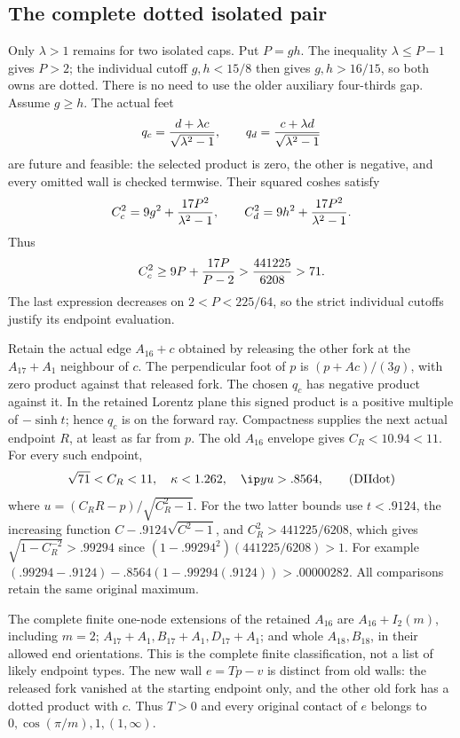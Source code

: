\subsection{The complete dotted isolated pair}
\label{app:D18isolateddotted}

Only \(\lambda>1\) remains for two isolated caps.
Put \(P=gh\).  The inequality \(\lambda\le P-1\)
gives \(P>2\); the individual cutoff \(g,h<15/8\)
then gives \(g,h>16/15\), so both owns are dotted.
There is no need to use the older auxiliary four-thirds gap.
Assume \(g\ge h\).
The actual feet
\[
 q_c={d+\lambda c\over\sqrt{\lambda^2-1}},\qquad
 q_d={c+\lambda d\over\sqrt{\lambda^2-1}}
\]
are future and feasible: the selected product is zero, the other
is negative, and every omitted wall is checked termwise.
Their squared coshes satisfy
\[
 C_c^2=9g^2+{17P^2\over\lambda^2-1},\qquad
 C_d^2=9h^2+{17P^2\over\lambda^2-1}.
\]
Thus
\[
 C_c^2\ge9P+{17P\over P-2}
 >{441225\over6208}>71.
\]
The last expression decreases on \(2<P<225/64\), so the strict
individual cutoffs justify its endpoint evaluation.

Retain the actual edge \(A_{16}+c\) obtained by releasing the other
fork at the \(A_{17}+A_1\) neighbour of \(c\).
The perpendicular foot of \(p\) is
\((p+Ac)/(3g)\), with zero product against that released fork.
The chosen \(q_c\) has negative product against it.
In the retained Lorentz plane this signed product is a positive
multiple of \(-\sinh t\); hence \(q_c\) is on the forward ray.
Compactness supplies the next actual endpoint \(R\), at least as
far from \(p\).  The old \(A_{16}\) envelope gives \(C_R<10.94<11\).
For every such endpoint,
\[
 \sqrt{71}<C_R<11,\quad
 \kappa<1.262,\quad \ip yu>.8564 ,
\tag{DIIdot}\label{eq:DIIdot}
\]
where \(u=(C_RR-p)/\sqrt{C_R^2-1}\).
For the two latter bounds use \(t<.9124\), the increasing function
\(C-.9124\sqrt{C^2-1}\), and
\(C_R^2>441225/6208\), which gives
\(\sqrt{1-C_R^{-2}}>.99294\) since
\((1-.99294^2)(441225/6208)>1\).
For example
\((.99294-.9124)-.8564(1-.99294(.9124))>.00000282\).
All comparisons retain the same original maximum.

The complete finite one-node extensions of the retained \(A_{16}\)
are \(A_{16}+I_2(m)\), including \(m=2\);
\(A_{17}+A_1,B_{17}+A_1,D_{17}+A_1\);
and whole \(A_{18},B_{18}\), in their allowed end orientations.
This is the complete finite classification, not a list of likely
endpoint types.  The new wall \(e=Tp-v\) is distinct from old
walls: the released fork vanished at the starting endpoint only,
and the other old fork has a dotted product with \(c\).
Thus \(T>0\) and every original contact of \(e\) belongs to
\(0,\cos(\pi/m),1,(1,\infty)\).

